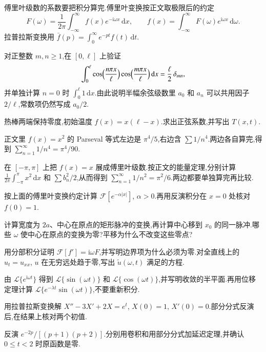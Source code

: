 傅里叶级数的系数要把积分算完.傅里叶变换按正文取极限后的约定
\begin{equation*}
  F(\omega)=\frac{1}{2\pi}\int_{-\infty}^{\infty}f(x)e^{-\mathrm{i}\omega x}\,\mathrm{d}x,
  \qquad
  f(x)=\int_{-\infty}^{\infty}F(\omega)e^{\mathrm{i}\omega x}\,\mathrm{d}\omega.
\end{equation*}
拉普拉斯变换用 $\bar f(p)=\int_0^{\infty}e^{-pt}f(t)\,\mathrm{d}t$.

\begin{problemset}
\renewcommand{\theenumi}{\thechapter.\arabic{enumi}}
\renewcommand{\labelenumi}{\theenumi.}
\item 对正整数 $m,n\geq 1$,在 $[0,\ell]$ 上验证
\begin{equation*}
  \int_0^{\ell}
  \cos\Bigl(\frac{n\pi x}{\ell}\Bigr)
  \cos\Bigl(\frac{m\pi x}{\ell}\Bigr)
  \,\mathrm{d}x
  =\frac{\ell}{2}\,\delta_{mn},
\end{equation*}
并单独计算 $n=0$ 时 $\int_0^{\ell}1\,\mathrm{d}x$.由此说明半幅余弦级数里 $a_0$ 和 $a_n$ 可以共用因子 $2/\ell$,常数项仍然写成 $a_0/2$.

\item 热棒两端保持零度,初始温度 $f(x)=x(\ell-x)$.求出正弦系数,并写出 $T(x,t)$.

\item 正文里 $f(x)=x^2$ 的 Parseval 等式左边是 $\pi^4/5$,右边含 $\sum 1/n^4$.两边各自算完,得到 $\sum_{n=1}^{\infty}1/n^4=\pi^4/90$.

\item 在 $[-\pi,\pi]$ 上把 $f(x)=x$ 展成傅里叶级数.按正文的能量定理,分别计算 $\frac{1}{2\pi}\int_{-\pi}^{\pi}x^2\,\mathrm{d}x$ 和 $\sum b_n^2/2$,从而得到 $\sum_{n=1}^{\infty}1/n^2=\pi^2/6$.两边都要单独算完再比较.

\item 按上面的傅里叶变换约定计算 $\mathcal{F}[e^{-\alpha|x|}]$, $\alpha>0$.再用反演积分在 $x=0$ 处核对 $f(0)=1$.

\item 计算宽度为 $2a$、中心在原点的矩形脉冲的变换,再计算中心移到 $x_0$ 的同一脉冲.哪些 $\omega$ 使中心在原点的变换为零?平移为什么不改变这些零点?

\item 用分部积分证明 $\mathcal{F}[f']=\mathrm{i}\omega F$,并写明边界项为什么必须为零.对全直线上的 $u_t=u_{xx}$, $u$ 在无穷远处趋于零,写出 $\tilde u(\omega,t)$ 满足的方程.

\item 由 $\mathcal{L}\{e^{\mathrm{i}\omega t}\}$ 得到 $\mathcal{L}\{\sin(\omega t)\}$ 和 $\mathcal{L}\{\cos(\omega t)\}$,并写明收敛的半平面.再用位移定理计算 $\mathcal{L}\{e^{-\lambda t}\sin(\omega t)\}$,不要重新积分.

\item 用拉普拉斯变换解 $X''-3X'+2X=e^{t}$, $X(0)=1$, $X'(0)=0$.部分分式反演后,在结果上核对两个初值.

\item 反演 $e^{-2p}/[(p+1)(p+2)]$.分别用卷积和用部分分式加延迟定理,并确认 $0\leq t<2$ 时原函数是零.
\end{problemset}
